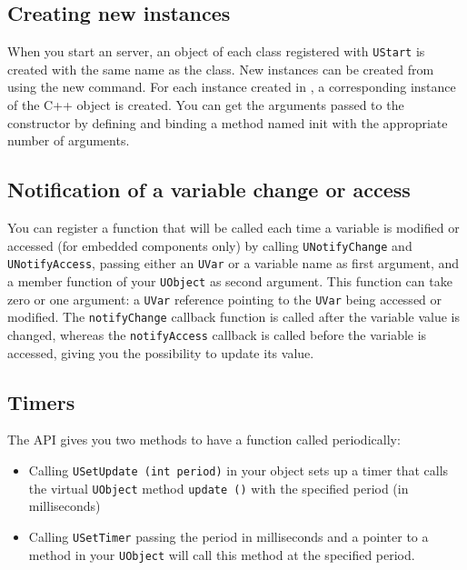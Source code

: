 \subsection{Creating new instances}

When you start an \urbi server, an object of each class registered with
\lstinline{UStart} is created with the same name as the class. New instances can
be created from \urbi using the new command. For each instance created
in \urbi, a corresponding instance of the C++ object is created. You
can get the arguments passed to the constructor by defining and
binding a method named init with the appropriate number of arguments.

\subsection{Notification of a variable change or access}

You can register a function that will be called each time a variable
is modified or accessed (for embedded components only) by calling
\lstinline{UNotifyChange} and \lstinline{UNotifyAccess}, passing
either an \lstinline{UVar} or a variable name as first argument, and a
member function of your \lstinline{UObject} as second argument. This
function can take zero or one argument: a \lstinline{UVar} reference
pointing to the \lstinline{UVar} being accessed or modified. The
\lstinline{notifyChange} callback function is called after the
variable value is changed, whereas the \lstinline{notifyAccess}
callback is called before the variable is accessed, giving you the
possibility to update its value.

\subsection{Timers}

The API gives you two methods to have a function called periodically:

\begin{itemize}
\item{Calling \lstinline{USetUpdate (int period)} in your object sets
  up a timer that calls the virtual \lstinline{UObject} method
  \lstinline{update ()} with the specified period (in milliseconds)}
\item{Calling \lstinline{USetTimer} passing the period in milliseconds
  and a pointer to a method in your \lstinline{UObject} will call this
  method at the specified period.}
\end{itemize}

